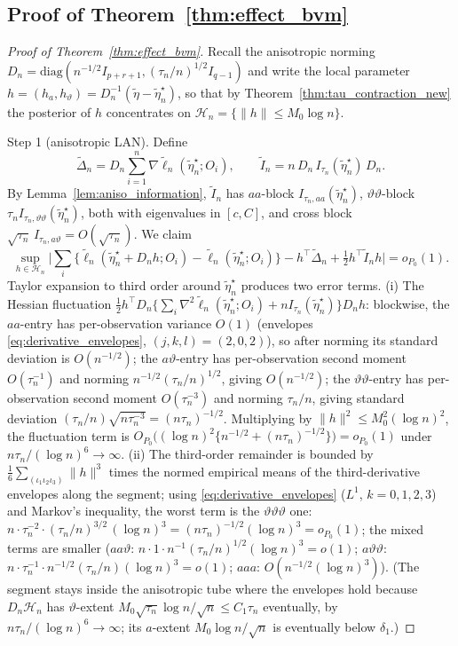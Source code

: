 \documentclass[11pt]{article}
\theoremstyle{definition}
\theoremstyle{plain}
\begin{document}
\subsection{Proof of Theorem~\ref{thm:effect_bvm}}

\begin{proof}[Proof of Theorem~\ref{thm:effect_bvm}]
Recall the anisotropic norming $D_n=\mathrm{diag}(n^{-1/2}I_{p+r+1},(\tau_n/n)^{1/2}I_{q-1})$ and write the local parameter $h=(h_a,h_\vartheta)=D_n^{-1}(\tilde\eta-\tilde\eta_n^\star)$, so that by Theorem~\ref{thm:tau_contraction_new} the posterior of $h$ concentrates on $\mathcal H_n=\{\|h\|\le M_0\log n\}$.

Step 1 (anisotropic LAN). Define
\[
\tilde\Delta_n=D_n\sum_{i=1}^n\nabla\tilde\ell_n(\tilde\eta_n^\star;O_i),
\qquad
\tilde I_n=n\,D_n\,I_{\tau_n}(\tilde\eta_n^\star)\,D_n .
\]
By Lemma~\ref{lem:aniso_information}, $\tilde I_n$ has $aa$-block $I_{\tau_n,aa}(\tilde\eta_n^\star)$, $\vartheta\vartheta$-block $\tau_nI_{\tau_n,\vartheta\vartheta}(\tilde\eta_n^\star)$, both with eigenvalues in $[c,C]$, and cross block $\sqrt{\tau_n}\,I_{\tau_n,a\vartheta}=O(\sqrt{\tau_n})$. We claim
\begin{equation}
\sup_{h\in\mathcal H_n}\Big|\sum_i\big\{\tilde\ell_n(\tilde\eta_n^\star+D_nh;O_i)-\tilde\ell_n(\tilde\eta_n^\star;O_i)\big\}-h^\top\tilde\Delta_n+\tfrac12h^\top\tilde I_nh\Big|=o_{P_0}(1).
\label{eq:aniso_lan}
\end{equation}
Taylor expansion to third order around $\tilde\eta_n^\star$ produces two error terms. (i) The Hessian fluctuation
$\tfrac12h^\top D_n\{\sum_i\nabla^2\tilde\ell_n(\tilde\eta_n^\star;O_i)+nI_{\tau_n}(\tilde\eta_n^\star)\}D_nh$:
blockwise, the $aa$-entry has per-observation variance $O(1)$ (envelopes \eqref{eq:derivative_envelopes}, $(j,k,l)=(2,0,2)$), so after norming its standard deviation is $O(n^{-1/2})$; the $a\vartheta$-entry has per-observation second moment $O(\tau_n^{-1})$ and norming $n^{-1/2}(\tau_n/n)^{1/2}$, giving $O(n^{-1/2})$; the $\vartheta\vartheta$-entry has per-observation second moment $O(\tau_n^{-3})$ and norming $\tau_n/n$, giving standard deviation $(\tau_n/n)\sqrt{n\tau_n^{-3}}=(n\tau_n)^{-1/2}$. Multiplying by $\|h\|^2\le M_0^2(\log n)^2$, the fluctuation term is
$O_{P_0}\big((\log n)^2\{n^{-1/2}+(n\tau_n)^{-1/2}\}\big)=o_{P_0}(1)$ under $n\tau_n/(\log n)^6\to\infty$.
(ii) The third-order remainder is bounded by $\tfrac16\sum_{(\iota_1\iota_2\iota_3)}\|h\|^3$ times the normed empirical means of the third-derivative envelopes along the segment; using \eqref{eq:derivative_envelopes} ($L^1$, $k=0,1,2,3$) and Markov's inequality, the worst term is the $\vartheta\vartheta\vartheta$ one:
$n\cdot\tau_n^{-2}\cdot(\tau_n/n)^{3/2}\,(\log n)^3=(n\tau_n)^{-1/2}(\log n)^3=o_{P_0}(1)$;
the mixed terms are smaller ($aa\vartheta$: $n\cdot1\cdot n^{-1}(\tau_n/n)^{1/2}(\log n)^3=o(1)$; $a\vartheta\vartheta$: $n\cdot\tau_n^{-1}\cdot n^{-1/2}(\tau_n/n)(\log n)^3=o(1)$; $aaa$: $O(n^{-1/2}(\log n)^3)$). (The segment stays inside the anisotropic tube where the envelopes hold because $D_n\mathcal H_n$ has $\vartheta$-extent $M_0\sqrt{\tau_n}\log n/\sqrt n\le C_1\tau_n$ eventually, by $n\tau_n/(\log n)^6\to\infty$; its $a$-extent $M_0\log n/\sqrt n$ is eventually below $\delta_1$.)


\end{proof}
\end{document}
